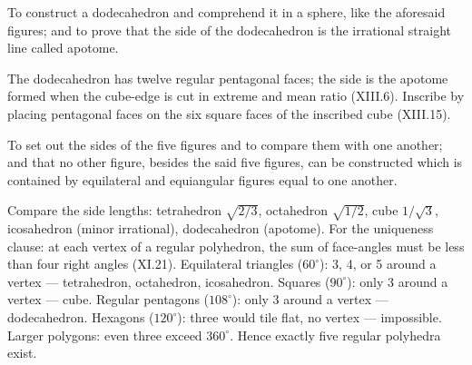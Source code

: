 \documentclass{rrxiv}
\begin{document}
\begin{claim}
\label{prop:XIII.17}
To construct a dodecahedron and comprehend it in a sphere, like the
aforesaid figures; and to prove that the side of the dodecahedron is
the irrational straight line called apotome.
\end{claim}
\begin{evidence}
\label{ev:XIII.17}
The dodecahedron has twelve regular pentagonal faces; the side is
the apotome formed when the cube-edge is cut in extreme and mean
ratio (XIII.6).  Inscribe by placing pentagonal faces on the six
square faces of the inscribed cube (XIII.15).
\end{evidence}

\begin{claim}
\label{prop:XIII.18}
To set out the sides of the five figures and to compare them with
one another; and that no other figure, besides the said five
figures, can be constructed which is contained by equilateral and
equiangular figures equal to one another.
\end{claim}
\begin{evidence}
\label{ev:XIII.18}
Compare the side lengths: tetrahedron $\sqrt{2/3}$, octahedron
$\sqrt{1/2}$, cube $1/\sqrt{3}$, icosahedron (minor irrational),
dodecahedron (apotome).  For the uniqueness clause: at each vertex of
a regular polyhedron, the sum of face-angles must be less than four
right angles (XI.21).  Equilateral triangles ($60^\circ$): 3, 4, or
5 around a vertex --- tetrahedron, octahedron, icosahedron.  Squares
($90^\circ$): only 3 around a vertex --- cube.  Regular pentagons
($108^\circ$): only 3 around a vertex --- dodecahedron.  Hexagons
($120^\circ$): three would tile flat, no vertex --- impossible.
Larger polygons: even three exceed $360^\circ$.  Hence exactly five
regular polyhedra exist.
\end{evidence}
\end{document}
